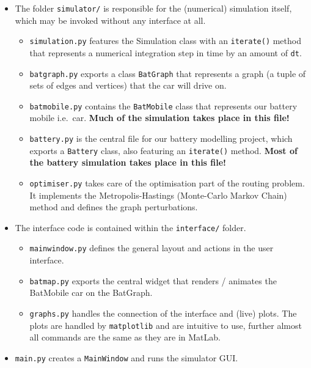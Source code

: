 \documentclass{prettytex/ox/mmsc-special-topic}
\begin{document}
  \begin{itemize}
    \tightlist
    \item
          The folder \texttt{simulator/} is responsible for the (numerical)
          simulation itself, which may be invoked without any interface at all.

          \begin{itemize}
            \tightlist
            \item
                  \texttt{simulation.py} features the Simulation class with an
                  \texttt{iterate()} method that represents a numerical integration
                  step in time by an amount of \texttt{dt}.
            \item
                  \texttt{batgraph.py} exports a class \texttt{BatGraph} that
                  represents a graph (a tuple of sets of edges and vertices) that the
                  car will drive on.
            \item
                  \texttt{batmobile.py} contains the \texttt{BatMobile} class that
                  represents our battery mobile i.e.~car. \textbf{Much of the
                    simulation takes place in this file!}
            \item
                  \texttt{battery.py} is the central file for our battery modelling
                  project, which exports a \texttt{Battery} class, also featuring an
                  \texttt{iterate()} method. \textbf{Most of the battery simulation
                    takes place in this file!}
            \item
                  \texttt{optimiser.py} takes care of the optimisation part of the routing problem. It implements the Metropolis-Hastings (Monte-Carlo Markov Chain) method and defines the graph perturbations.
          \end{itemize}
    \item
          The interface code is contained within the \texttt{interface/} folder.

          \begin{itemize}
            \tightlist
            \item
                  \texttt{mainwindow.py} defines the general layout and actions in the
                  user interface.
            \item
                  \texttt{batmap.py} exports the central widget that renders /
                  animates the BatMobile car on the BatGraph.
            \item
                  \texttt{graphs.py} handles the connection of the interface and (live) plots. The plots are handled by \texttt{matplotlib} and are intuitive to use, further almost all commands are the same as they are in MatLab.
          \end{itemize}
    \item
          \texttt{main.py} creates a \texttt{MainWindow} and runs the simulator
          GUI.
  \end{itemize}
\end{document}
